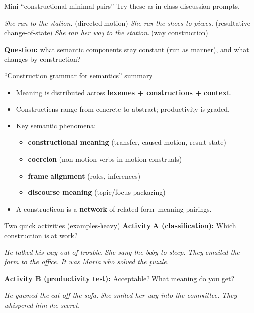 \begin{frame}{Mini “constructional minimal pairs”}
\small
Try these as in-class discussion prompts.


\begin{exe}
  \ex \emph{She ran to the station.} (directed motion)
  \ex \emph{She ran the shoes to pieces.} (resultative change-of-state)
  \ex \emph{She ran her way to the station.} (way construction)
\end{exe}


\vspace{0.5em}
\textbf{Question:} what semantic components stay constant (run as manner), and what changes by construction?
\end{frame}

\begin{frame}{“Construction grammar for semantics” summary}
\small
\begin{itemize}
  \item Meaning is distributed across \textbf{lexemes + constructions + context}.
  \item Constructions range from concrete to abstract; productivity is graded.
  \item Key semantic phenomena:
    \begin{itemize}
      \item \textbf{constructional meaning} (transfer, caused motion, result state)
      \item \textbf{coercion} (non-motion verbs in motion construals)
      \item \textbf{frame alignment} (roles, inferences)
      \item \textbf{discourse meaning} (topic/focus packaging)
    \end{itemize}
  \item A constructicon is a \textbf{network} of related form--meaning pairings.
\end{itemize}
\end{frame}

\begin{frame}{Two quick activities (examples-heavy)}
\small
\textbf{Activity A (classification):} Which construction is at work?

\begin{exe}
  \ex \emph{He talked his way out of trouble.}
  \ex \emph{She sang the baby to sleep.}
  \ex \emph{They emailed the form to the office.}
  \ex \emph{It was Maria who solved the puzzle.}
\end{exe}


\vspace{0.5em}
\textbf{Activity B (productivity test):} Acceptable? What meaning do you get?

\begin{exe}
  \ex \emph{He yawned the cat off the sofa.}
  \ex \emph{She smiled her way into the committee.}
  \ex \emph{They whispered him the secret.}
\end{exe}

\end{frame}

